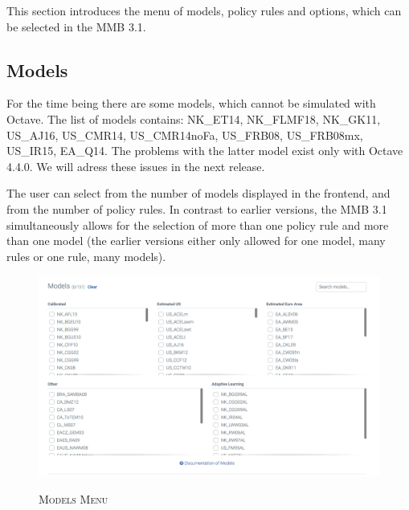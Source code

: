 This section introduces the menu of models, policy rules and options, which can be selected in the MMB 3.1.
\subsection*{Models}
For the time being there are some models, which cannot be simulated with Octave. The list of models contains: NK\_ET14, NK\_FLMF18, NK\_GK11, US\_AJ16, US\_CMR14, US\_CMR14noFa, US\_FRB08, US\_FRB08mx, US\_IR15, EA\_Q14. The problems with the latter model exist only with Octave 4.4.0. We will adress these issues in the next release.

The user can select from the number of models displayed in the frontend, and from the number of policy rules. In contrast to earlier versions, the MMB 3.1 simultaneously allows for the selection of more than one policy rule and more than one model (the earlier versions either only allowed for one model, many rules or one rule, many models). 


\begin{figure}[H]
	\centering
	\caption{\textsc{Models Menu}}
	\vspace{0.2cm}
	\includegraphics[width=15cm,keepaspectratio]{frontend_models31.png}\\
	\label{img:Models}
\end{figure}

